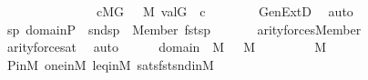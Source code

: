 \begin{isabellebody}
\ \ \ \ \isamarkupfalse%
\ \isamarkupfalse%
\ {\isasymchi}\ \isanewline
\ \ \ \ \ \ {\isachardoublequoteopen}c{\isasymin}M{\isacharbrackleft}{\kern0pt}G{\isacharbrackright}{\kern0pt}{\isachardoublequoteclose}\ {\isachardoublequoteopen}{\isasymchi}\ {\isasymin}\ M{\isachardoublequoteclose}\ {\isachardoublequoteopen}val{\isacharparenleft}{\kern0pt}G{\isacharcomma}{\kern0pt}{\isasymchi}{\isacharparenright}{\kern0pt}\ {\isacharequal}{\kern0pt}\ c{\isachardoublequoteclose}\isanewline
\ \ \ \ \ \ \isamarkupfalse%
\ GenExtD\ \isamarkupfalse%
\ auto\isanewline
\ \ \ \ \isamarkupfalse%
\ {\isacharquery}{\kern0pt}{\isasymtheta}{\isacharequal}{\kern0pt}{\isachardoublequoteopen}{\isacharbraceleft}{\kern0pt}sp\ {\isasymin}domain{\isacharparenleft}{\kern0pt}{\isasymtau}{\isacharparenright}{\kern0pt}{\isasymtimes}P\ {\isachardot}{\kern0pt}\ snd{\isacharparenleft}{\kern0pt}sp{\isacharparenright}{\kern0pt}\ {\isasymtturnstile}\ {\isacharparenleft}{\kern0pt}Member{\isacharparenleft}{\kern0pt}{}{\isacharcomma}{\kern0pt}{}{\isacharparenright}{\kern0pt}{\isacharparenright}{\kern0pt}\ {\isacharbrackleft}{\kern0pt}fst{\isacharparenleft}{\kern0pt}sp{\isacharparenright}{\kern0pt}{\isacharcomma}{\kern0pt}{\isasymchi}{\isacharbrackright}{\kern0pt}\ {\isacharbraceright}{\kern0pt}{\isachardoublequoteclose}\isanewline
\ \ \ \ \isamarkupfalse%
\ {\isachardoublequoteopen}arity{\isacharparenleft}{\kern0pt}forces{\isacharparenleft}{\kern0pt}Member{\isacharparenleft}{\kern0pt}{}{\isacharcomma}{\kern0pt}{}{\isacharparenright}{\kern0pt}{\isacharparenright}{\kern0pt}{\isacharparenright}{\kern0pt}\ {\isacharequal}{\kern0pt}\ {}{\isachardoublequoteclose}\isanewline
\ \ \ \ \ \ \isamarkupfalse%
\ arity{\isacharunderscore}{\kern0pt}forces{\isacharunderscore}{\kern0pt}at\ \isamarkupfalse%
\ auto\isanewline
\ \ \ \ \isamarkupfalse%
\ {\isacartoucheopen}domain{\isacharparenleft}{\kern0pt}{\isasymtau}{\isacharparenright}{\kern0pt}\ {\isasymin}\ M{\isacartoucheclose}\ {\isacartoucheopen}{\isasymchi}\ {\isasymin}\ M{\isacartoucheclose}\ \isanewline
\ \ \ \ \isamarkupfalse%
\ {\isachardoublequoteopen}{\isacharquery}{\kern0pt}{\isasymtheta}\ {\isasymin}\ M{\isachardoublequoteclose}\isanewline
\ \ \ \ \ \ \isamarkupfalse%
\ P{\isacharunderscore}{\kern0pt}in{\isacharunderscore}{\kern0pt}M\ one{\isacharunderscore}{\kern0pt}in{\isacharunderscore}{\kern0pt}M\ leq{\isacharunderscore}{\kern0pt}in{\isacharunderscore}{\kern0pt}M\ sats{\isacharunderscore}{\kern0pt}fst{\isacharunderscore}{\kern0pt}snd{\isacharunderscore}{\kern0pt}in{\isacharunderscore}{\kern0pt}M\isanewline

\end{isabellebody}

